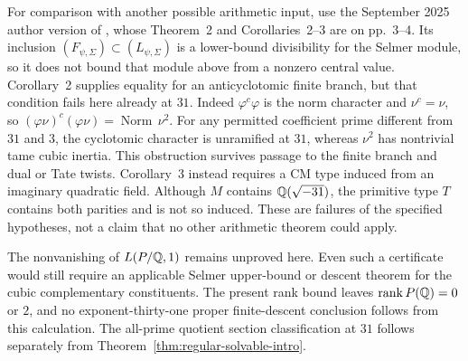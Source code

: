 For comparison with another possible arithmetic input, use the
September 2025 author version of \citet{Hsieh2014}, whose
Theorem~2 and Corollaries~2--3 are on pp.~3--4.
Its inclusion $(F_{\psi,\Sigma})\subset(L_{\psi,\Sigma})$
is a lower-bound divisibility for the Selmer module, so it does
not bound that module above from a nonzero central value.
Corollary~2 supplies equality for an anticyclotomic finite branch,
but that condition fails here already at $31$.
Indeed $\varphi^c\varphi$ is the norm character and
$\nu^c=\nu$, so
$(\varphi\nu)^c(\varphi\nu)=\operatorname{Norm}\,\nu^2$.
For any permitted coefficient prime different from $31$ and $3$,
the cyclotomic character is unramified at $31$, whereas $\nu^2$
has nontrivial tame cubic inertia. This obstruction survives
passage to the finite branch and dual or Tate twists.
Corollary~3 instead requires a CM type induced from an imaginary
quadratic field. Although $M$ contains $\mathbb Q(\sqrt{-31})$, the
primitive type $T$ contains both parities and is not so induced.
These are failures of the specified hypotheses, not a claim that
no other arithmetic theorem could apply.

The nonvanishing of $L(P/\mathbb Q,1)$ remains unproved here.
Even such a certificate would still require an applicable Selmer
upper-bound or descent theorem for the cubic complementary
constituents. The present rank bound leaves
$\operatorname{rank}P(\mathbb Q)=0$ or $2$, and no exponent-thirty-one
proper finite-descent conclusion follows from this calculation.
The all-prime quotient section classification at $31$ follows
separately from Theorem~\ref{thm:regular-solvable-intro}.
